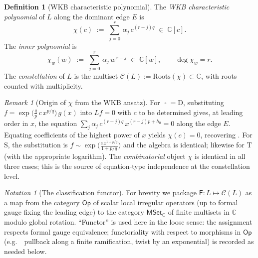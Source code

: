 \documentclass[11pt,a4paper]{article}
\theoremstyle{plain}
\theoremstyle{definition}
\newtheorem{definition}[theorem]{Definition}
\theoremstyle{remark}
\newtheorem{remark}[theorem]{Remark}
\newtheorem{notation}[theorem]{Notation}
\newcommand{\op}{\mathop{\square}}                %
\newcommand{\opD}{\mathrm{D}}                     %
\newcommand{\opS}{\mathrm{S}}                     %
\newcommand{\opT}{\mathrm{T}}                     %
\newcommand{\Roots}{\mathrm{Roots}}
\newcommand{\Cl}{\mathcal{C}}
\newcommand{\Fclass}{\mathsf{F}}
\newcommand{\eg}{e.g.\ }
\begin{document}
\begin{definition}[WKB characteristic polynomial]\label{def:chi}
The \emph{WKB characteristic polynomial} of $L$ along the dominant edge $E$
is
\[
   \chi(c)
   \;:=\;
   \sum_{j=0}^{r}\, \alpha_j\, c^{(r-j)q}
   \;\in\; \mathbb{C}[c].
\]
The \emph{inner polynomial} is
\[
   \chi_w(w)
   \;:=\;
   \sum_{j=0}^{r}\, \alpha_j\, w^{\,r-j}
   \;\in\; \mathbb{C}[w],
   \qquad \deg \chi_w = r.
\]
The \emph{constellation} of $L$ is the multiset
$\Cl(L) := \Roots(\chi) \subset \mathbb{C}$, with roots counted with
multiplicity.
\end{definition}

\begin{remark}[Origin of $\chi$ from the WKB ansatz]\label{rem:chi-from-ansatz}
For $\op = \opD$, substituting $f = \exp\!\big(\frac{q}{p}\, c\, x^{p/q}\big)\,
g(x)$ into $L f = 0$ with $c$ to be determined gives, at leading order in
$x$, the equation $\sum_j \alpha_j\, c^{(r-j)q}\, x^{(r-j)p + h_0} = 0$ along
the edge $E$. Equating coefficients of the highest power of $x$ yields
$\chi(c) = 0$, recovering . For $\opS$, the substitution is
$f \sim \exp\!\big(\frac{c\, x^{1 + p/q}}{1 + p/q}\big)$ and the algebra is
identical; likewise for $\opT$ (with the appropriate logarithm). The
\emph{combinatorial} object $\chi$ is identical in all three cases; this
is the source of equation-type independence at the constellation level.
\end{remark}

\begin{notation}[The classification functor]\label{not:F}
For brevity we package $\Fclass \colon L \mapsto \Cl(L)$ as a map from the
category $\mathsf{Op}$ of scalar local irregular operators (up to formal
gauge fixing the leading edge) to the category $\mathsf{MSet}_\mathbb{C}$
of finite multisets in $\mathbb{C}$ modulo global rotation. ``Functor'' is
used here in the loose sense: the assignment respects formal gauge
equivalence; functoriality with respect to morphisms in $\mathsf{Op}$
(\eg\ pullback along a finite ramification, twist by an exponential)
is recorded as needed below.
\end{notation}
\end{document}
